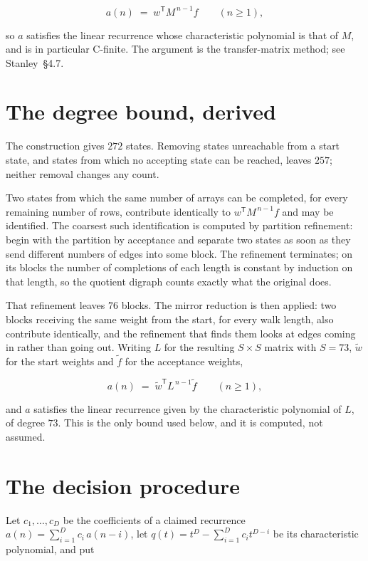\documentclass[11pt]{article}
\theoremstyle{definition}
\begin{document}
\[a(n) \;=\; w^{\mathsf T} M^{\,n-1} f \qquad (n \ge 1),\]

so $a$ satisfies the linear recurrence whose characteristic polynomial is that of $M$, and is in particular C-finite. The argument is the transfer-matrix method; see Stanley~\S4.7.

\section{The degree bound, derived}

The construction gives $272$ states. Removing states unreachable from a start state, and states from which no accepting state can be reached, leaves $257$; neither removal changes any count.

Two states from which the same number of arrays can be completed, for every remaining number of rows, contribute identically to $w^{\mathsf T}M^{\,n-1}f$ and may be identified. The coarsest such identification is computed by partition refinement: begin with the partition by acceptance and separate two states as soon as they send different numbers of edges into some block. The refinement terminates; on its blocks the number of completions of each length is constant by induction on that length, so the quotient digraph counts exactly what the original does.

That refinement leaves $76$ blocks. The mirror reduction is then applied: two blocks receiving the same weight from the start, for every walk length, also contribute identically, and the refinement that finds them looks at edges coming in rather than going out. Writing $L$ for the resulting $S \times S$ matrix with $S = 73$, $\tilde w$ for the start weights and $\tilde f$ for the acceptance weights,

\[a(n) \;=\; \tilde w^{\mathsf T} L^{\,n-1} \tilde f \qquad (n \ge 1),\]

and $a$ satisfies the linear recurrence given by the characteristic polynomial of $L$, of degree $73$. This is the only bound used below, and it is computed, not assumed.

\section{The decision procedure}

Let $c_1,\dots,c_D$ be the coefficients of a claimed recurrence $a(n) = \sum_{i=1}^{D} c_i\,a(n-i)$, let $q(t) = t^{D} - \sum_{i=1}^{D} c_i t^{D-i}$ be its characteristic polynomial, and put
\end{document}
